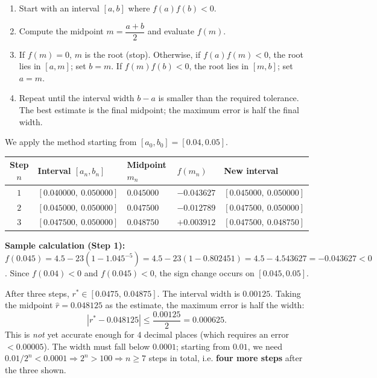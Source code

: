 \documentclass[11pt]{article}
\begin{document}
\begin{methode}
\begin{enumerate}
\item Start with an interval $[a,b]$ where $f(a)f(b)<0$.
\item Compute the midpoint $m=\dfrac{a+b}{2}$ and evaluate $f(m)$.
\item If $f(m)=0$, $m$ is the root (stop). Otherwise, if $f(a)f(m)<0$, the root lies in $[a,m]$; set $b=m$. If $f(m)f(b)<0$, the root lies in $[m,b]$; set $a=m$.
\item Repeat until the interval width $b-a$ is smaller than the required tolerance. The best estimate is the final midpoint; the maximum error is half the final width.
\end{enumerate}
\end{methode}

\begin{exoresolu}
We apply the method starting from $[a_0,b_0]=[0.04,0.05]$.

\begin{center}
\begin{tabular}{|c|l|l|l|l|}
\hline
\rowcolor{popblueL} Step $n$ & Interval $[a_n,b_n]$ & Midpoint $m_n$ & $f(m_n)$ & New interval \\
\hline
$1$ & $[0.040000,\ 0.050000]$ & $0.045000$ & $-0.043627$ & $[0.045000,\ 0.050000]$ \\
\hline
$2$ & $[0.045000,\ 0.050000]$ & $0.047500$ & $-0.012789$ & $[0.047500,\ 0.050000]$ \\
\hline
$3$ & $[0.047500,\ 0.050000]$ & $0.048750$ & $+0.003912$ & $[0.047500,\ 0.048750]$ \\
\hline
\end{tabular}
\end{center}

\textbf{Sample calculation (Step 1):}
$f(0.045)=4.5-23\left(1-1.045^{-5}\right)=4.5-23(1-0.802451)=4.5-4.543627=-0.043627<0$.
Since $f(0.04)<0$ and $f(0.045)<0$, the sign change occurs on $[0.045,0.05]$.

After three steps, $r^{*}\in[0.0475,\,0.04875]$. The interval width is $0.00125$. Taking the midpoint $\hat{r}=0.048125$ as the estimate, the maximum error is half the width:
\[ |r^{*}-0.048125|\le\frac{0.00125}{2}=0.000625. \]
This is \emph{not} yet accurate enough for $4$ decimal places (which requires an error $<0.00005$). The width must fall below $0.0001$; starting from $0.01$, we need $0.01/2^n<0.0001\Rightarrow 2^n>100\Rightarrow n\ge7$ steps in total, i.e. \textbf{four more steps} after the three shown.
\end{exoresolu}
\end{document}
